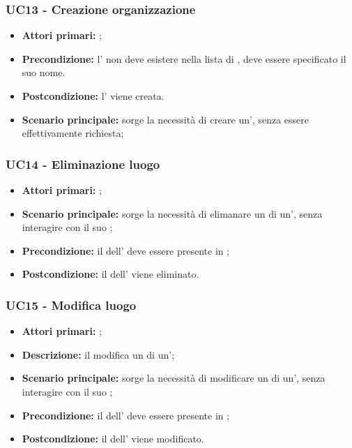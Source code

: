 \documentclass[casi-duso]{subfiles}
\begin{document}
\subsubsection{UC13 - Creazione organizzazione}
\label{subsub:UC13}
\begin{itemize}
  \item \textbf{Attori primari:} ;
  \item \textbf{Precondizione:} l' non deve esistere nella lista di , deve essere specificato il suo nome.
  \item \textbf{Postcondizione:} l' viene creata.
  \item \textbf{Scenario principale:} sorge la necessità di creare un', senza essere effettivamente richiesta;
  
\end{itemize}

\subsubsection{UC14 - Eliminazione luogo}
\label{subsub:UC14}
\begin{itemize}
  \item \textbf{Attori primari:} ;
  \item \textbf{Scenario principale:} sorge la necessità di elimanare un  di un', senza interagire con il suo ;
  \item \textbf{Precondizione:} il  dell' deve essere presente in ;
  \item \textbf{Postcondizione:} il  dell' viene eliminato.

\end{itemize}

\subsubsection{UC15 - Modifica luogo}
\label{subsub:UC15}
\begin{itemize}
  \item \textbf{Attori primari:} ;
  \item \textbf{Descrizione:} il  modifica un  di un';
  \item \textbf{Scenario principale:} sorge la necessità di modificare un  di un', senza interagire con il suo ;
  \item \textbf{Precondizione:} il  dell' deve essere presente in ;
  \item \textbf{Postcondizione:} il  dell' viene modificato.

\end{itemize}
\end{document}
